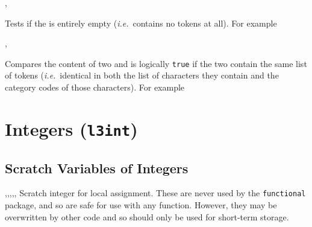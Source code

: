 \documentclass[oneside]{book}
\begin{document}
\begin{function}{\TlIfEmpty,\TlIfEmptyTF}
\begin{syntax}
 
   
\end{syntax}
Tests if the  is entirely empty
(\emph{i.e.}~contains no tokens at all). For example
\begin{demo}
\TlSet{}
\TlIfEmptyTF{}
\TlClear\lTmpaTl
\TlIfEmptyTF{}
\end{demo}
\end{function}

\begin{function}{\TlIfEq,\TlIfEqTF}
\begin{syntax}
  
    
\end{syntax}
Compares the content of two  and
is logically \texttt{true} if the two contain the same list of
tokens (\emph{i.e.}~identical in both the list of characters they
contain and the category codes of those characters). For example
\begin{demo}
\TlSet{}
\TlSet{}
\TlSet{}
\TlIfEqTF\lTmpaTl{}
\TlIfEqTF\lTmpaTl{}
\end{demo}
\end{function}

\chapter{Integers (\texttt{l3int})}

\section{Scratch Variables of Integers}

\begin{variable}{\lTmpaInt,\lTmpbInt,\lTmpcInt,\lTmpiInt,\lTmpjInt,\lTmpkInt}
Scratch integer for local assignment. These are never used by
the \verb!functional! package, and so are safe for use with any
function. However, they may be overwritten by other
code and so should only be used for short-term storage.
\end{variable}
\end{document}
